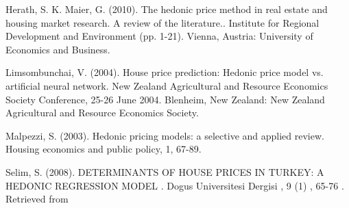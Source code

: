 \documentclass[10pt,A4,makeidx]{article}
\begin{document}

\begin{thebibliography}{9}
Herath, S. K. Maier, G. (2010). The hedonic price method in real estate and housing market research. A review of the literature.. Institute for Regional Development and Environment (pp. 1-21). Vienna, Austria: University of Economics and Business.

Limsombunchai, V. (2004). House price prediction: Hedonic price model vs. artificial neural network. New Zealand Agricultural and Resource Economics Society Conference, 25-26 June 2004. Blenheim, New Zealand: New Zealand Agricultural and Resource Economics Society.

Malpezzi, S. (2003). Hedonic pricing models: a selective and applied review. Housing economics and public policy, 1, 67-89.

Selim, S. (2008). DETERMINANTS OF HOUSE PRICES IN TURKEY: A HEDONIC REGRESSION MODEL . Dogus Universitesi Dergisi , 9 (1) , 65-76 . Retrieved from 
\end{thebibliography}
\end{document}
